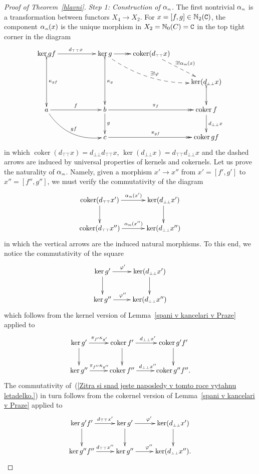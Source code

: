\documentclass[12pt,leqno]{amsart}
\theoremstyle{definition}
\def\amix{\alpha_{\scriptscriptstyle{\it{m}}}}
\def\dttop{d_{\scriptscriptstyle{\top\top}}}
\def\dttop{d_{\scriptscriptstyle{\top\top}}}
\def\dbbot{d_{\scriptscriptstyle\bot\bot}}
\newcommand{\C}{{\tt C}}
\newcommand{\NN}{\mathbb{N}}
\newcommand{\4}{\texttt{4}}
\DeclareMathOperator{\coker}{coker}
\renewcommand{\phi}{\varphi}
\begin{document}
\begin{proof}[Proof of Theorem~\ref{hlavni}]
\noindent\textit{Step 1: Construction of $\amix$.} The first nontrivial
$\amix$ is a transformation between functors \hbox{$X_4\to X_2$}. 
For $x = [f,g]\in \NN_2(\C)$, the component $\amix(x)$ is the
unique morphism in $X_2=\NN_0(C) = \C$ in the top tight corner in
the diagram
\begin{equation}
\label{tma uz o pul osme}
\xymatrix{\ker gf  \ar[rr]^{\dttop x} \ar@{>->}[dd]^{\kappa_{gf}} 
&& \ker g \ar@{->>}[r]  \ar@{>->}[dd]^{\kappa_g} \ar@{-->}@/_1.5em/[drr]^{\exists ! \phi}
& \coker (\dttop x) \ar@{-->}[dr]^{\exists ! \amix(x)}
\\
&&&& \ker  (\dbbot x) \ar@{>->}[d]
\\
a \ar@/_1.5em/[rrd]^{gf} \ar[rr]^f &&b \ar[d]^g \ar@{->>}[rr]^{\pi_f} && \coker f \ar[d]^{\dbbot x} 
\\
&& c\ar@{->>}[rr]^{\pi_{gf}} &&  \coker gf 
}
\end{equation}
in which  $\coker(\dttop
x) = \dbbot \dttop x$, $\ker (\dbbot x) = \dttop \dbbot x$ and
the dashed arrows are
induced by universal properties of kernels and cokernels. 
Let us prove the naturality of $\amix$. Namely, given a morphism  $x' \to x''$
from $x'= [f',g']$ to  $x'' =[f'',g'']$,
we must verify the commutativity of the diagram 
\begin{equation}
\label{Zitra si snad jeste naposledy v tomto roce vytahnu letadelko.}
\xymatrix@C=3.2em{
\coker (\dttop x') \ar[r]^(.53){\amix(x')} \ar[d] & 
\ker (\dbbot x') \ar[d]
\\
\coker (\dttop x'') \ar[r]^(.53){\amix(x'')} & \ker (\dbbot x'')
}
\end{equation}
in which the vertical arrows are the induced natural morphisms. To
this end, we notice the commutativity of the square
\[
\xymatrix{
\ker  g' \ar[r]^(.43){\phi'} \ar[d] & \ker (\dbbot x')\ar[d]
\\
\ker  g'' \ar[r]^(.43){\phi''} & \ker (\dbbot x'')
}
\]
which follows from the kernel version of Lemma~\ref{spani v kancelari v
  Praze} applied to
\[
\xymatrix@C=2.5em{
\ker g' \ar[r]^(.47){\pi_{f'}\kappa_{g'}} \ar[d] &  \coker f'   \ar[d]
\ar[r]^{\dbbot x'} 
&  \ar[d] \coker g'f'
\\
\ker g'' \ar[r]^(.47){\pi_{f''}\kappa_{g''}} &  \coker f'' 
\ar[r]^{\dbbot x''} 
&   \coker g''f''.
}
\]
The commutativity of~(\ref{Zitra si snad jeste naposledy v tomto roce
  vytahnu letadelko.}) 
in turn follows from the cokernel version of Lemma~\ref{spani v kancelari v
  Praze} applied to
\[
\xymatrix@C=2.5em{
\ker g'f'\ar[r]^(.54){\dttop x'} \ar[d]  &  \ar[d]   \ker g' \ar[r]^{\phi'} 
&  \ar[d] \ker (\dbbot x')
\\
\ker g''f''\ar[r]^(.54){\dttop x''}  &    \ker g'' \ar[r]^{\phi''} 
&  \ker (\dbbot x'') .
}
\]


\end{proof}
\end{document}

